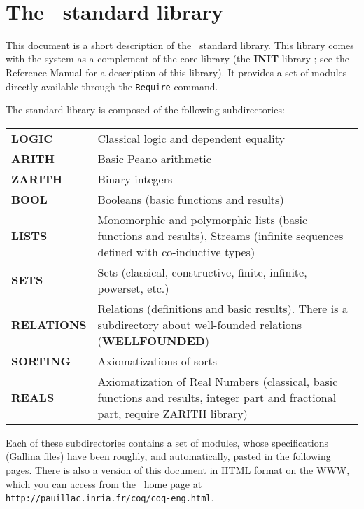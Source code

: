 \documentclass[11pt]{article}
\begin{document}
 
%
{\ }

\tableofcontents

\newpage
\section*{The \Coq\ standard library}

This document is a short description of the \Coq\ standard library.
This library comes with the system as a complement of the core library
(the {\bf INIT} library ; see the Reference Manual for a description
of this library). It provides a set of modules directly available
through the \verb!Require! command.

The standard library is composed of the following subdirectories:

\medskip
\begin{tabular}{lp{10cm}}
  {\bf LOGIC}   & Classical logic and dependent equality \\
  {\bf ARITH}   & Basic Peano arithmetic \\
  {\bf ZARITH}  & Binary integers \\
  {\bf BOOL}    &  Booleans (basic functions and results) \\
  {\bf LISTS}   & Monomorphic and polymorphic lists (basic functions and
            results), Streams (infinite sequences defined with co-inductive
            types) \\
  {\bf SETS}    & Sets (classical, constructive, finite, infinite, powerset,
            etc.) \\
 {\bf RELATIONS} & Relations (definitions and basic results). There is
             a subdirectory about well-founded relations ({\bf WELLFOUNDED}) \\
 {\bf SORTING}   & Axiomatizations of sorts \\
 {\bf REALS}   & Axiomatization of Real Numbers (classical, basic functions 
                 and results, integer part and fractional part, require ZARITH
                 library)
\end{tabular}
\medskip

Each of these subdirectories contains a set of modules, whose
specifications ({\sf Gallina} files) have
been roughly, and automatically, pasted in the following pages. There
is also a version of this document in HTML format on the WWW, which
you can access from the \Coq\ home page at
\texttt{http://pauillac.inria.fr/coq/coq-eng.html}.



\end{document}
